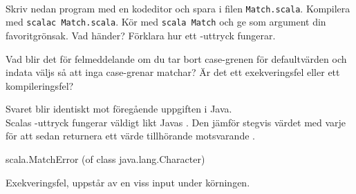 






\QUESTBEGIN

\Task \label{task:vegomatch} \what~   %

\Subtask \label{subtask:vegomatch} Skriv nedan program med en kodeditor och spara i filen \texttt{Match.scala}. Kompilera med \texttt{scalac Match.scala}. Kör med \texttt{scala Match} och ge som argument din favoritgrönsak. Vad händer? Förklara hur ett -uttryck fungerar.


\Subtask Vad blir det för felmeddelande om du tar bort case-grenen för defaultvärden och indata väljs så att inga case-grenar matchar? Är det ett exekveringsfel eller ett kompileringsfel?




\SOLUTION


\TaskSolved \what


\SubtaskSolved  Svaret blir identiskt mot föregående uppgiften i Java.\\
Scalas -uttryck fungerar väldigt likt Javas . Den jämför stegvis värdet med varje  för att sedan returnera ett värde tillhörande motsvarande .

\SubtaskSolved  \begin{REPL}
scala.MatchError (of class java.lang.Character)
\end{REPL}
Exekveringsfel, uppstår av en viss input under körningen.




